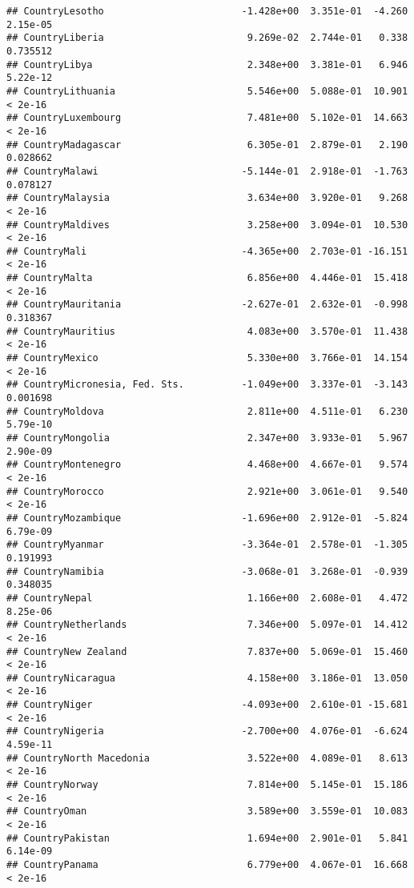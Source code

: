 \documentclass[
]{article}
\begin{document}
\begin{verbatim}
## CountryLesotho                        -1.428e+00  3.351e-01  -4.260 2.15e-05
## CountryLiberia                         9.269e-02  2.744e-01   0.338 0.735512
## CountryLibya                           2.348e+00  3.381e-01   6.946 5.22e-12
## CountryLithuania                       5.546e+00  5.088e-01  10.901  < 2e-16
## CountryLuxembourg                      7.481e+00  5.102e-01  14.663  < 2e-16
## CountryMadagascar                      6.305e-01  2.879e-01   2.190 0.028662
## CountryMalawi                         -5.144e-01  2.918e-01  -1.763 0.078127
## CountryMalaysia                        3.634e+00  3.920e-01   9.268  < 2e-16
## CountryMaldives                        3.258e+00  3.094e-01  10.530  < 2e-16
## CountryMali                           -4.365e+00  2.703e-01 -16.151  < 2e-16
## CountryMalta                           6.856e+00  4.446e-01  15.418  < 2e-16
## CountryMauritania                     -2.627e-01  2.632e-01  -0.998 0.318367
## CountryMauritius                       4.083e+00  3.570e-01  11.438  < 2e-16
## CountryMexico                          5.330e+00  3.766e-01  14.154  < 2e-16
## CountryMicronesia, Fed. Sts.          -1.049e+00  3.337e-01  -3.143 0.001698
## CountryMoldova                         2.811e+00  4.511e-01   6.230 5.79e-10
## CountryMongolia                        2.347e+00  3.933e-01   5.967 2.90e-09
## CountryMontenegro                      4.468e+00  4.667e-01   9.574  < 2e-16
## CountryMorocco                         2.921e+00  3.061e-01   9.540  < 2e-16
## CountryMozambique                     -1.696e+00  2.912e-01  -5.824 6.79e-09
## CountryMyanmar                        -3.364e-01  2.578e-01  -1.305 0.191993
## CountryNamibia                        -3.068e-01  3.268e-01  -0.939 0.348035
## CountryNepal                           1.166e+00  2.608e-01   4.472 8.25e-06
## CountryNetherlands                     7.346e+00  5.097e-01  14.412  < 2e-16
## CountryNew Zealand                     7.837e+00  5.069e-01  15.460  < 2e-16
## CountryNicaragua                       4.158e+00  3.186e-01  13.050  < 2e-16
## CountryNiger                          -4.093e+00  2.610e-01 -15.681  < 2e-16
## CountryNigeria                        -2.700e+00  4.076e-01  -6.624 4.59e-11
## CountryNorth Macedonia                 3.522e+00  4.089e-01   8.613  < 2e-16
## CountryNorway                          7.814e+00  5.145e-01  15.186  < 2e-16
## CountryOman                            3.589e+00  3.559e-01  10.083  < 2e-16
## CountryPakistan                        1.694e+00  2.901e-01   5.841 6.14e-09
## CountryPanama                          6.779e+00  4.067e-01  16.668  < 2e-16

\end{verbatim}
\end{document}
